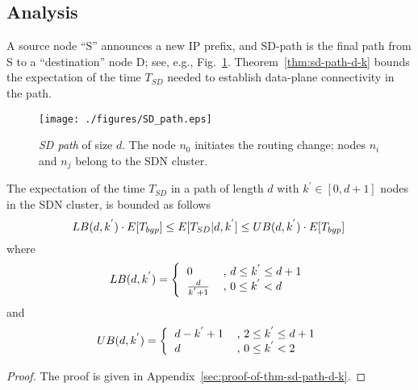 \subsection{Analysis}


A source node ``S'' announces a new IP prefix, and SD-path is the final path from S to a ``destination'' node D; see, e.g., Fig.~\ref{fig:sd-path}. Theorem~\ref{thm:sd-path-d-k} bounds the expectation of the time $T_{SD}$ needed to establish data-plane connectivity in the path.

\begin{figure}
\texttt{[image: ./figures/SD\_path.eps]}
\caption{\textit{SD path} of size $d$. The node $n_{0}$ initiates the routing change; nodes $n_{i}$ and $n_{j}$ belong to the SDN cluster.}
\label{fig:sd-path}
\end{figure}


%

\begin{theorem}\label{thm:sd-path-d-k}
The expectation of the time $T_{SD}$ in a path of length $d$ with $k^{'} \in [0,d+1]$ nodes in the SDN cluster, is bounded as follows
\begin{equation}
\hspace{-0.08cm}LB(d,k^{'})\cdot E[T_{bgp}] \leq E[T_{SD}|d,k^{'}] \leq UB(d,k^{'})\cdot E[T_{bgp}]
\end{equation}
where 
\begin{equation}
LB(d,k^{'})= \left\{
\begin{tabular}{ll}
$0$				&, $d\leq k^{'} \leq d+1$\\
$\frac{d}{k^{'}+1}$	&, $0\leq k^{'}< d$
\end{tabular}
\right.
\end{equation}
and
\begin{equation}
UB(d,k^{'})= \left\{
\begin{tabular}{ll}
$d-k^{'}+1$	&, $2\leq k^{'}\leq d+1$\\
$d$				&, $0\leq k^{'} <2$
\end{tabular}
\right.
\end{equation}
\end{theorem}
\begin{proof}
The proof is given in Appendix~\ref{sec:proof-of-thm-sd-path-d-k}.
\end{proof}

